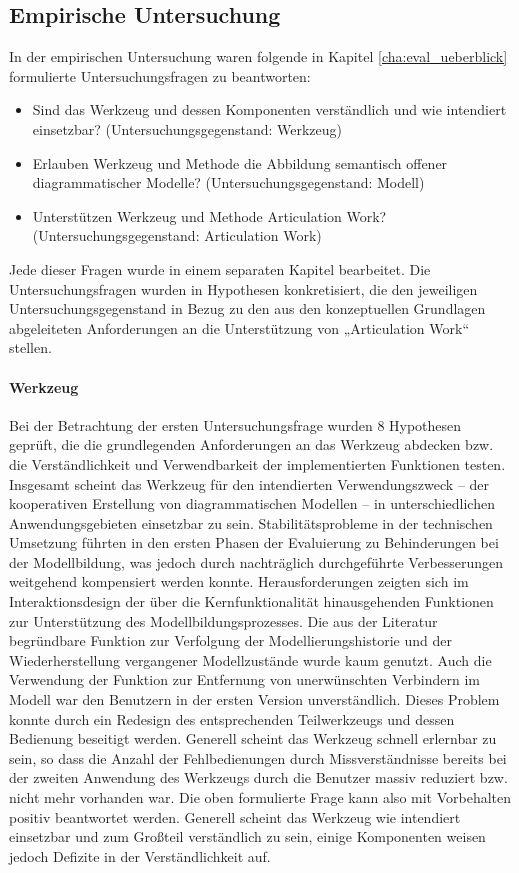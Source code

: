 \subsection{Empirische Untersuchung}

In der empirischen Untersuchung waren folgende in Kapitel \ref{cha:eval_ueberblick} formulierte Untersuchungsfragen zu beantworten:

\begin{itemize}
 \item Sind das Werkzeug und dessen Komponenten verständlich und wie intendiert einsetzbar? (Untersuchungsgegenstand: Werkzeug)
 \item Erlauben Werkzeug und Methode die Abbildung semantisch offener diagrammatischer Modelle? (Untersuchungsgegenstand: Modell)
 \item Unterstützen Werkzeug und Methode Articulation Work? (Untersuchungsgegenstand: Articulation Work)
\end{itemize}

Jede dieser Fragen wurde in einem separaten Kapitel bearbeitet. Die Untersuchungsfragen wurden in Hypothesen konkretisiert, die den jeweiligen Untersuchungsgegenstand in Bezug zu den aus den konzeptuellen Grundlagen abgeleiteten Anforderungen an die Unterstützung von „Articulation Work“ stellen.

\paragraph{Werkzeug} %
Bei der Betrachtung der ersten Untersuchungsfrage wurden 8 Hypothesen geprüft, die die grundlegenden Anforderungen an das Werkzeug abdecken bzw. die Verständlichkeit und Verwendbarkeit der implementierten Funktionen testen. Insgesamt scheint das Werkzeug für den intendierten Verwendungszweck -- der kooperativen Erstellung von diagrammatischen Modellen -- in unterschiedlichen Anwendungsgebieten einsetzbar zu sein. Stabilitätsprobleme in der technischen Umsetzung führten in den ersten Phasen der Evaluierung zu Behinderungen bei der Modellbildung, was jedoch durch nachträglich durchgeführte Verbesserungen weitgehend kompensiert werden konnte. Herausforderungen zeigten sich im Interaktionsdesign der über die Kernfunktionalität hinausgehenden Funktionen zur Unterstützung des Modellbildungsprozesses. Die aus der Literatur begründbare Funktion zur Verfolgung der Modellierungshistorie und der Wiederherstellung vergangener Modellzustände wurde kaum genutzt. Auch die Verwendung der Funktion zur Entfernung von unerwünschten Verbindern im Modell war den Benutzern in der ersten Version unverständlich. Dieses Problem konnte durch ein Redesign des entsprechenden Teilwerkzeugs und dessen Bedienung beseitigt werden. Generell scheint das Werkzeug schnell erlernbar zu sein, so dass die Anzahl der Fehlbedienungen durch Missverständnisse bereits bei der zweiten Anwendung des Werkzeugs durch die Benutzer massiv reduziert bzw. nicht mehr vorhanden war. Die oben formulierte Frage kann also mit Vorbehalten positiv beantwortet werden. Generell scheint das Werkzeug wie intendiert einsetzbar und zum Großteil verständlich zu sein, einige Komponenten weisen jedoch Defizite in der Verständlichkeit auf.

